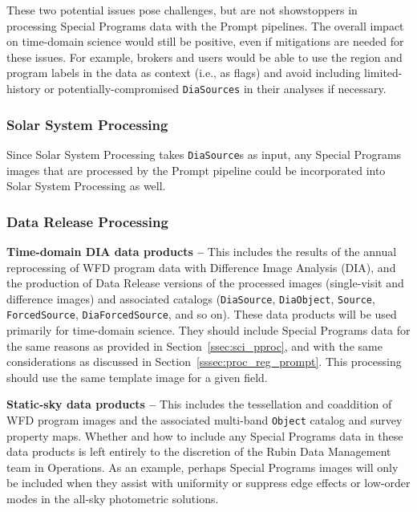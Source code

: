 These two potential issues pose challenges, but are not showstoppers in processing 
Special Programs data with the Prompt pipelines. 
The overall impact on time-domain science would still be positive, even 
if mitigations are needed for these issues.
For example, brokers and users would be able to use the region and program labels
in the data as context (i.e., as flags) and avoid including 
limited-history or potentially-compromised {\tt DiaSources} in their
analyses if necessary.

\subsubsection{Solar System Processing}\label{sssec:proc_reg_ss}

Since Solar System Processing takes {\tt DiaSource}s as input, any 
Special Programs images that are processed by the Prompt pipeline
could be incorporated into Solar System Processing as well.

\subsubsection{Data Release Processing}\label{sssec:proc_reg_dr}

\textbf{Time-domain DIA data products --}
This includes the results of the annual reprocessing of WFD program data with 
Difference Image Analysis (DIA), and the production of Data Release
versions of the processed images (single-visit and difference images)
and associated catalogs ({\tt DiaSource}, {\tt DiaObject}, {\tt Source},
{\tt ForcedSource}, {\tt DiaForcedSource}, and so on).
These data products will be used primarily for time-domain science.
They should include Special Programs data for the same reasons as
provided in Section~\ref{ssec:sci_pproc}, and with the same 
considerations as discussed in Section~\ref{sssec:proc_reg_prompt}.
This processing should use the same template image for a given field.

\textbf{Static-sky data products --}
This includes the tessellation and coaddition of WFD program images
and the associated multi-band {\tt Object} catalog and survey property maps.
Whether and how to include any Special Programs data in these data products
is left entirely to the discretion of the Rubin Data Management team in Operations.
As an example, perhaps Special Programs images will only be included when they 
assist with uniformity or suppress edge effects or low-order modes in the 
all-sky photometric solutions.


